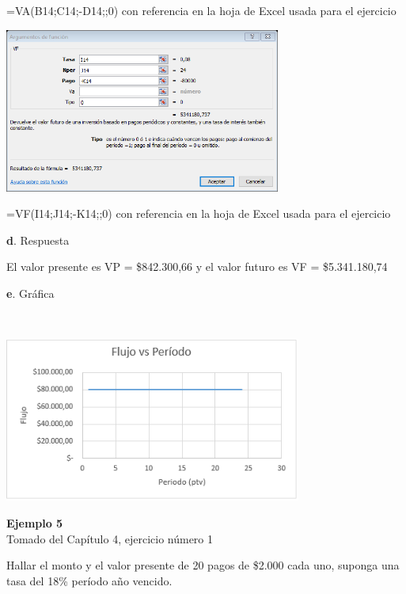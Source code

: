 =VA(B14;C14;-D14;;0) con referencia en la hoja de Excel usada para el ejercicio
\\
 \begin{center}
	\includegraphics[height=5.4cm]{img/ch8/8_5.png}
\end{center}
=VF(I14;J14;-K14;;0) con referencia en la hoja de Excel usada para el ejercicio

\vspace{2mm}

\textbf{d}. Respuesta

\vspace{2mm}

El valor presente es VP = \$842.300,66 y el valor futuro es VF = \$5.341.180,74

\vspace{2mm}

\textbf{e}. Gráfica


\ \begin{center}
	\includegraphics[height=5.4cm]{img/ch8/8_6.png}
\end{center}

\textbf{Ejemplo 5}\\

Tomado del Capítulo 4, ejercicio número 1

\vspace{2mm}

Hallar el monto y el valor presente de 20 pagos de \$2.000 cada uno, suponga una tasa del 18\% período año vencido.

